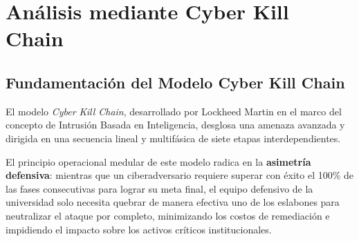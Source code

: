 \chapter{Análisis mediante Cyber Kill Chain}\label{ch:cyber_kill_chain}

\section{Fundamentación del Modelo Cyber Kill Chain}

El modelo \textit{Cyber Kill Chain}, desarrollado por Lockheed Martin en el marco del concepto de Intrusión Basada en Inteligencia, desglosa una amenaza avanzada y dirigida en una secuencia lineal y multifásica de siete etapas interdependientes.

El principio operacional medular de este modelo radica en la \textbf{asimetría defensiva}: mientras que un ciberadversario requiere superar con éxito el 100\% de las fases consecutivas para lograr su meta final, el equipo defensivo de la universidad solo necesita quebrar de manera efectiva uno de los eslabones para neutralizar el ataque por completo, minimizando los costos de remediación e impidiendo el impacto sobre los activos críticos institucionales.

